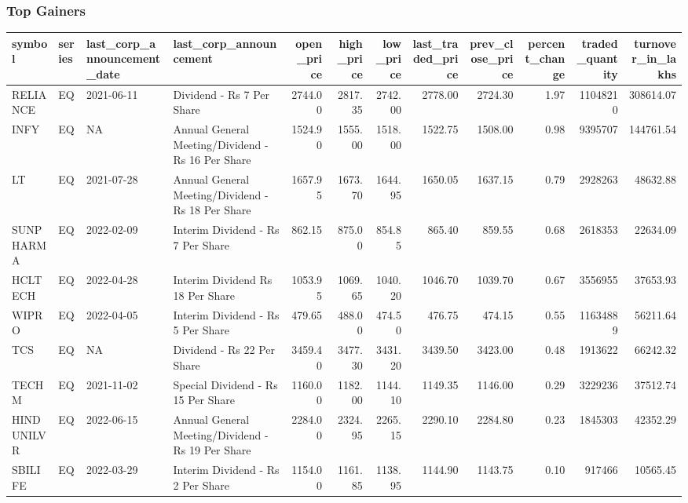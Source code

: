 \documentclass[
]{article}
\begin{document}
\hypertarget{top-gainers}{%
\subsubsection{Top Gainers}\label{top-gainers}}

\begin{table}
\centering\begingroup\fontsize{12}{14}\selectfont

\begin{tabular}{l|l|l|l|r|r|r|r|r|r|r|r}
\hline
symbol & series & last\_corp\_announcement\_date & last\_corp\_announcement & open\_price & high\_price & low\_price & last\_traded\_price & prev\_close\_price & percent\_change & traded\_quantity & turnover\_in\_lakhs\\
\hline
RELIANCE & EQ & 2021-06-11 & Dividend - Rs 7 Per Share & 2744.00 & 2817.35 & 2742.00 & 2778.00 & 2724.30 & 1.97 & 11048210 & 308614.07\\
\hline
INFY & EQ & NA & Annual General Meeting/Dividend - Rs 16 Per Share & 1524.90 & 1555.00 & 1518.00 & 1522.75 & 1508.00 & 0.98 & 9395707 & 144761.54\\
\hline
LT & EQ & 2021-07-28 & Annual General Meeting/Dividend - Rs 18 Per Share & 1657.95 & 1673.70 & 1644.95 & 1650.05 & 1637.15 & 0.79 & 2928263 & 48632.88\\
\hline
SUNPHARMA & EQ & 2022-02-09 & Interim Dividend - Rs 7 Per Share & 862.15 & 875.00 & 854.85 & 865.40 & 859.55 & 0.68 & 2618353 & 22634.09\\
\hline
HCLTECH & EQ & 2022-04-28 & Interim Dividend Rs 18 Per Share & 1053.95 & 1069.65 & 1040.20 & 1046.70 & 1039.70 & 0.67 & 3556955 & 37653.93\\
\hline
WIPRO & EQ & 2022-04-05 & Interim Dividend - Rs 5 Per Share & 479.65 & 488.00 & 474.50 & 476.75 & 474.15 & 0.55 & 11634889 & 56211.64\\
\hline
TCS & EQ & NA & Dividend - Rs 22 Per Share & 3459.40 & 3477.30 & 3431.20 & 3439.50 & 3423.00 & 0.48 & 1913622 & 66242.32\\
\hline
TECHM & EQ & 2021-11-02 & Special Dividend - Rs 15 Per Share & 1160.00 & 1182.00 & 1144.10 & 1149.35 & 1146.00 & 0.29 & 3229236 & 37512.74\\
\hline
HINDUNILVR & EQ & 2022-06-15 & Annual General Meeting/Dividend - Rs  19 Per Share & 2284.00 & 2324.95 & 2265.15 & 2290.10 & 2284.80 & 0.23 & 1845303 & 42352.29\\
\hline
SBILIFE & EQ & 2022-03-29 & Interim Dividend - Rs 2 Per Share & 1154.00 & 1161.85 & 1138.95 & 1144.90 & 1143.75 & 0.10 & 917466 & 10565.45\\
\hline
\end{tabular}
\endgroup{}
\end{table}
\end{document}
